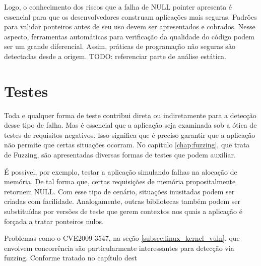 			
			Logo, o conhecimento dos riscos que a falha de NULL pointer apresenta é essencial
			para que os desenvolvedores construam aplicações mais seguras.
			Padrões para validar ponteiros antes de seu uso devem ser apresentados e cobrados.
			Nesse aspecto, ferramentas automáticas para verificação da qualidade do código podem
			ser um grande diferencial. Assim, práticas de programação não seguras são
			detectadas desde a origem. TODO: referenciar parte de análise estática.

		\section{Testes}
			Toda e qualquer forma de teste contribui direta ou indiretamente para a detecção
			desse tipo de falha. Mas é essencial que a aplicação seja examinada sob
			a ótica de testes de requisitos negativos. Isso significa que é preciso
			garantir que a aplicação não permite que certas situações ocorram.
			No capítulo \ref{chap:fuzzing}, que trata de Fuzzing, são apresentadas
			diversas formas de testes que podem auxiliar.

			
			É possível, por exemplo, testar a aplicação simulando falhas na alocação de memória.
			De tal forma que, certas requisições de memória propositalmente retornem NULL.
			Com esse tipo de cenário, situações inusitadas podem ser criadas com facilidade.
			Analogamente, outras bibliotecas também podem ser substituídas por versões
			de teste que gerem contextos nos quais a aplicação é forçada a tratar ponteiros nulos.			


			Problemas como o CVE2009-3547, na seção \ref{subsec:linux_kernel_vuln}, que envolvem
			concorrência são particularmente interessantes para detecção via fuzzing.
			Conforme tratado no capítulo dest


